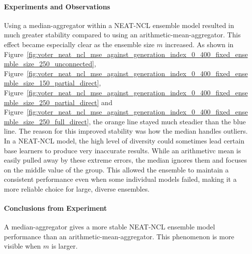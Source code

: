 \documentclass{article}
\begin{document}
\paragraph{Experiments and Observations}
Using a median-aggregator within a NEAT-NCL ensemble model resulted in much greater stability compared to using an arithmetic-mean-aggregator. This effect became especially clear as the ensemble size $m$ increased. As shown in Figure~\ref{fig:voter_neat_ncl_mse_against_generation_index_0_400_fixed_ensemble_size_250_unconnected}, Figure~\ref{fig:voter_neat_ncl_mse_against_generation_index_0_400_fixed_ensemble_size_150_partial_direct}, Figure~\ref{fig:voter_neat_ncl_mse_against_generation_index_0_400_fixed_ensemble_size_250_partial_direct} and Figure~\ref{fig:voter_neat_ncl_mse_against_generation_index_0_400_fixed_ensemble_size_250_full_direct}, the orange line stayed much steadier than the blue line. The reason for this improved stability was how the median handles outliers. In a NEAT-NCL model, the high level of diversity could sometimes lead certain base learners to produce very inaccurate results. While an arithmetivc mean is easily pulled away by these extreme errors, the median ignores them and focuses on the middle value of the group. This allowed the ensemble to maintain a consistent performance even when some individual models failed, making it a more reliable choice for large, diverse ensembles. 

\paragraph{Conclusions from Experiment}
A median-aggregator gives a more stable NEAT-NCL ensemble model performance than an arithmetic-mean-aggregator. This phenomenon is more visible when $m$ is larger. 


\end{document}
